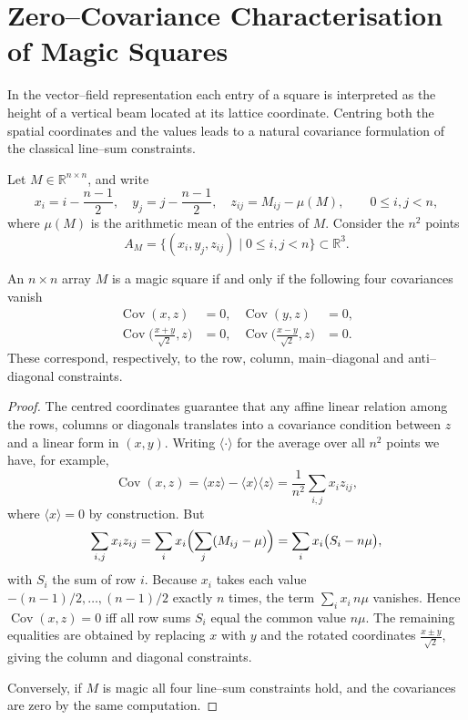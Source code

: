 \section{Zero--Covariance Characterisation of Magic Squares}\label{sec:covariance-proof}

In the vector--field representation each entry of a square is interpreted as the height of a vertical beam located at its lattice coordinate.  Centring both the spatial coordinates and the values leads to a natural covariance formulation of the classical line–sum constraints.

Let $M\in\mathbb{R}^{n\times n}$, and write
\[
    x_i = i-\frac{n-1}{2},\quad y_j = j-\frac{n-1}{2},\quad z_{ij}=M_{ij}-\mu(M),\qquad 0\le i,j<n,
\]
where $\mu(M)$ is the arithmetic mean of the entries of $M$.  Consider the $n^2$ points
\[
    A_M=\{(x_i,y_j,z_{ij})\mid 0\le i,j<n\}\subset \mathbb{R}^3.
\]

\begin{theorem}\label{thm:axial-covariance}
An $n\times n$ array $M$ is a magic square if and only if the following four covariances vanish
\begin{align}
    \operatorname{Cov}(x,z) &= 0, & \operatorname{Cov}(y,z) &= 0,\\
    \operatorname{Cov}\!\bigl(\tfrac{x+y}{\sqrt2},z\bigr) &= 0, & \operatorname{Cov}\!\bigl(\tfrac{x-y}{\sqrt2},z\bigr) &= 0.
\end{align}
These correspond, respectively, to the row, column, main–diagonal and anti–diagonal constraints.
\end{theorem}

\begin{proof}
The centred coordinates guarantee that any affine linear relation among the rows, columns or diagonals translates into a covariance condition between $z$ and a linear form in $(x,y)$.  Writing $\langle\cdot\rangle$ for the average over all $n^2$ points we have, for example,
\[
    \operatorname{Cov}(x,z)=\langle xz\rangle-\langle x\rangle\langle z\rangle=\frac{1}{n^2}\sum_{i,j}x_i z_{ij},
\]
where $\langle x\rangle=0$ by construction.  But
\[
    \sum_{i,j}x_i z_{ij}=\sum_{i}x_i\Bigl(\sum_j(M_{ij}-\mu)\Bigr)=\sum_{i}x_i\bigl(S_i - n\mu\bigr),
\]
with $S_i$ the sum of row $i$.  Because $x_i$ takes each value $-(n-1)/2,\dots,(n-1)/2$ exactly $n$ times, the term $\sum_i x_i\,n\mu$ vanishes.  Hence $\operatorname{Cov}(x,z)=0$ iff all row sums $S_i$ equal the common value $n\mu$.  The remaining equalities are obtained by replacing $x$ with $y$ and the rotated coordinates $\tfrac{x\pm y}{\sqrt2}$, giving the column and diagonal constraints.

Conversely, if $M$ is magic all four line–sum constraints hold, and the covariances are zero by the same computation.\end{proof}

